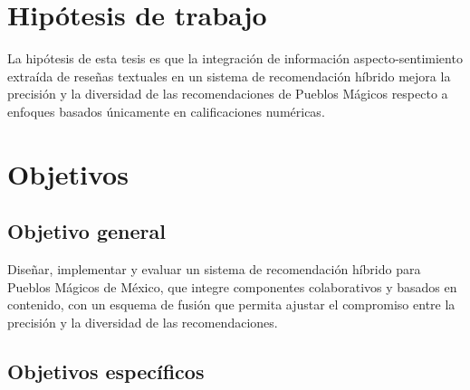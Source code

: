 \section{Hipótesis de trabajo} \label{sec:hypothesis}

La hipótesis de esta tesis es que la integración de información aspecto-sentimiento extraída de reseñas textuales en un sistema de recomendación híbrido mejora la precisión y la diversidad de las recomendaciones de Pueblos Mágicos respecto a enfoques basados únicamente en calificaciones numéricas.

\section{Objetivos} \label{sec:objective}

\subsection*{Objetivo general}

Diseñar, implementar y evaluar un sistema de recomendación híbrido para Pueblos Mágicos de México, que integre componentes colaborativos y basados en contenido, con un esquema de fusión que permita ajustar el compromiso entre la precisión y la diversidad de las recomendaciones.

\subsection*{Objetivos específicos}

